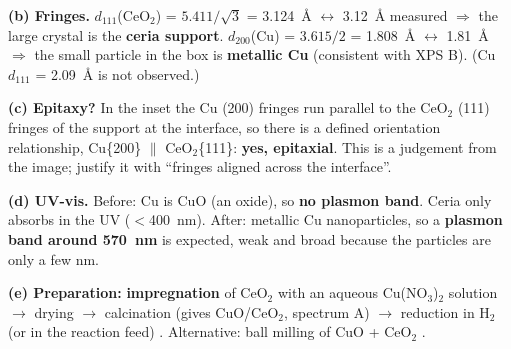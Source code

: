 \textbf{(b) Fringes.}
$d_{111}$(CeO$_2$) = $5.411/\sqrt3$ = \SI{3.124}{\angstrom} $\leftrightarrow$ \SI{3.12}{\angstrom} measured $\Rightarrow$ the large crystal is the
\textbf{ceria support}.
$d_{200}$(Cu) = $3.615/2$ = \SI{1.808}{\angstrom} $\leftrightarrow$ \SI{1.81}{\angstrom} $\Rightarrow$ the small particle in the box is
\textbf{metallic Cu} (consistent with XPS B). (Cu $d_{111}$ = \SI{2.09}{\angstrom} is not observed.)

\textbf{(c) Epitaxy?} In the inset the Cu (200) fringes run parallel to the CeO$_2$ (111) fringes of the support at the
interface, so there is a defined orientation relationship, Cu\{200\} $\parallel$ CeO$_2$\{111\}: \textbf{yes, epitaxial}.
This is a judgement from the image; justify it with ``fringes aligned across the interface''.

\textbf{(d) UV-vis.} Before: Cu is CuO (an oxide), so \textbf{no plasmon band}. Ceria only absorbs in the UV ($<$\SI{400}{nm}).
After: metallic Cu nanoparticles, so a \textbf{plasmon band around \SI{570}{nm}}  is expected, weak and broad because the
particles are only a few nm.

\textbf{(e) Preparation:} \textbf{impregnation} of CeO$_2$ with an aqueous Cu(NO$_3$)$_2$ solution $\to$ drying $\to$
calcination (gives CuO/CeO$_2$, spectrum A) $\to$ reduction in H$_2$ (or in the reaction feed) .
Alternative: ball milling of CuO + CeO$_2$ .

